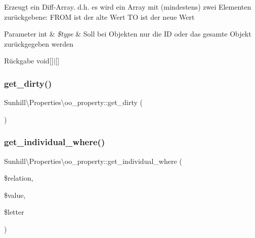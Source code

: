 Erzeugt ein Diff-\/\+Array. d.\+h. es wird ein Array mit (mindestens) zwei Elementen zurückgebene\+: F\+R\+OM ist der alte Wert TO ist der neue Wert 
\begin{DoxyParams}[1]{Parameter}
int & {\em \$type} & Soll bei Objekten nur die ID oder das gesamte Objekt zurückgegeben werden \\
\hline
\end{DoxyParams}
\begin{DoxyReturn}{Rückgabe}
void\mbox{[}\mbox{]}$\vert$\mbox{[}\mbox{]} 
\end{DoxyReturn}
\mbox{\label{classSunhill_1_1Properties_1_1oo__property_a5509007431816607291966c6ab7daa11}} 
\subsubsection{\texorpdfstring{get\+\_\+dirty()}{get\_dirty()}}
{\footnotesize\ttfamily Sunhill\textbackslash{}\+Properties\textbackslash{}oo\+\_\+property\+::get\+\_\+dirty (\begin{DoxyParamCaption}{ }\end{DoxyParamCaption})}

\mbox{\label{classSunhill_1_1Properties_1_1oo__property_a4d2f6cdf3cb90aa8da32be607c6292df}} 
\subsubsection{\texorpdfstring{get\+\_\+individual\+\_\+where()}{get\_individual\_where()}}
{\footnotesize\ttfamily Sunhill\textbackslash{}\+Properties\textbackslash{}oo\+\_\+property\+::get\+\_\+individual\+\_\+where (\begin{DoxyParamCaption}\item[{}]{\$relation,  }\item[{}]{\$value,  }\item[{}]{\$letter }\end{DoxyParamCaption})\hspace{0.3cm}{\ttfamily [protected]}}


